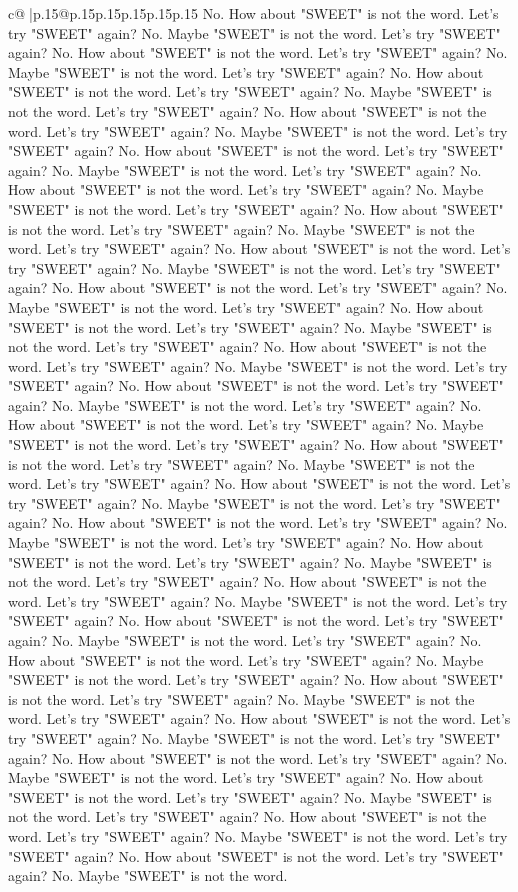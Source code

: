 \documentclass{article}
\begin{document}
{\begin{supertabular}{c@{$\;$}|p{.15\linewidth}@{}p{.15\linewidth}p{.15\linewidth}p{.15\linewidth}p{.15\linewidth}p{.15\linewidth}}
{{{No. How about "SWEET" is not the word. Let's try "SWEET" again? No. Maybe "SWEET" is not the word. Let's try "SWEET" again? No. How about "SWEET" is not the word. Let's try "SWEET" again? No. Maybe "SWEET" is not the word. Let's try "SWEET" again? No. How about "SWEET" is not the word. Let's try "SWEET" again? No. Maybe "SWEET" is not the word. Let's try "SWEET" again? No. How about "SWEET" is not the word. Let's try "SWEET" again? No. Maybe "SWEET" is not the word. Let's try "SWEET" again? No. How about "SWEET" is not the word. Let's try "SWEET" again? No. Maybe "SWEET" is not the word. Let's try "SWEET" again? No. How about "SWEET" is not the word. Let's try "SWEET" again? No. Maybe "SWEET" is not the word. Let's try "SWEET" again? No. How about "SWEET" is not the word. Let's try "SWEET" again? No. Maybe "SWEET" is not the word. Let's try "SWEET" again? No. How about "SWEET" is not the word. Let's try "SWEET" again? No. Maybe "SWEET" is not the word. Let's try "SWEET" again? No. How about "SWEET" is not the word. Let's try "SWEET" again? No. Maybe "SWEET" is not the word. Let's try "SWEET" again? No. How about "SWEET" is not the word. Let's try "SWEET" again? No. Maybe "SWEET" is not the word. Let's try "SWEET" again? No. How about "SWEET" is not the word. Let's try "SWEET" again? No. Maybe "SWEET" is not the word. Let's try "SWEET" again? No. How about "SWEET" is not the word. Let's try "SWEET" again? No. Maybe "SWEET" is not the word. Let's try "SWEET" again? No. How about "SWEET" is not the word. Let's try "SWEET" again? No. Maybe "SWEET" is not the word. Let's try "SWEET" again? No. How about "SWEET" is not the word. Let's try "SWEET" again? No. Maybe "SWEET" is not the word. Let's try "SWEET" again? No. How about "SWEET" is not the word. Let's try "SWEET" again? No. Maybe "SWEET" is not the word. Let's try "SWEET" again? No. How about "SWEET" is not the word. Let's try "SWEET" again? No. Maybe "SWEET" is not the word. Let's try "SWEET" again? No. How about "SWEET" is not the word. Let's try "SWEET" again? No. Maybe "SWEET" is not the word. Let's try "SWEET" again? No. How about "SWEET" is not the word. Let's try "SWEET" again? No. Maybe "SWEET" is not the word. Let's try "SWEET" again? No. How about "SWEET" is not the word. Let's try "SWEET" again? No. Maybe "SWEET" is not the word. Let's try "SWEET" again? No. How about "SWEET" is not the word. Let's try "SWEET" again? No. Maybe "SWEET" is not the word. Let's try "SWEET" again? No. How about "SWEET" is not the word. Let's try "SWEET" again? No. Maybe "SWEET" is not the word. Let's try "SWEET" again? No. How about "SWEET" is not the word. Let's try "SWEET" again? No. Maybe "SWEET" is not the word. Let's try "SWEET" again? No. How about "SWEET" is not the word. Let's try "SWEET" again? No. Maybe "SWEET" is not the word. Let's try "SWEET" again? No. How about "SWEET" is not the word. Let's try "SWEET" again? No. Maybe "SWEET" is not the word. Let's try "SWEET" again? No. How about "SWEET" is not the word. Let's try "SWEET" again? No. Maybe "SWEET" is not the word. Let's try "SWEET" again? No. How about "SWEET" is not the word. Let's try "SWEET" again? No. Maybe "SWEET" is not the word. }}}
\end{supertabular}}
\end{document}
